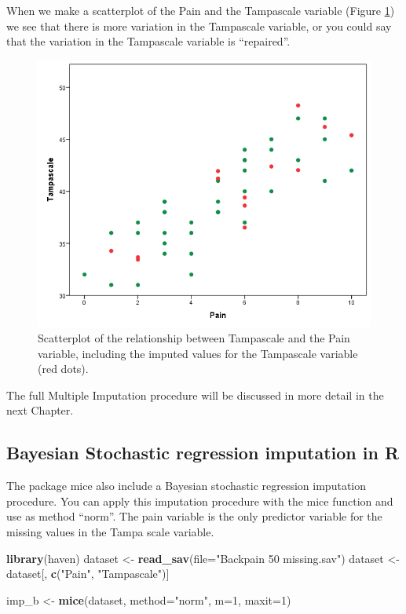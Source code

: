 \documentclass[
]{book}
\newenvironment{Shaded}{\begin{snugshade}}{\end{snugshade}}
\newcommand{\DataTypeTok}[1]{\textcolor[rgb]{0.13,0.29,0.53}{#1}}
\newcommand{\DecValTok}[1]{\textcolor[rgb]{0.00,0.00,0.81}{#1}}
\newcommand{\KeywordTok}[1]{\textcolor[rgb]{0.13,0.29,0.53}{\textbf{#1}}}
\newcommand{\NormalTok}[1]{#1}
\newcommand{\StringTok}[1]{\textcolor[rgb]{0.31,0.60,0.02}{#1}}
\begin{document}
When we make a scatterplot of the Pain and the Tampascale variable (Figure \ref{fig:fig3-24}) we see that there is more variation in the Tampascale variable, or you could say that the variation in the Tampascale variable is ``repaired''.

\begin{figure}

{\centering \includegraphics[width=0.7\linewidth]{images/Fig3.24} 

}

\caption{Scatterplot of the relationship between Tampascale and the Pain variable, including the imputed values for the Tampascale variable (red dots).}\label{fig:fig3-24}
\end{figure}

The full Multiple Imputation procedure will be discussed in more detail in the next Chapter.

\hypertarget{bayesian-stochastic-regression-imputation-in-r}{%
\subsection{Bayesian Stochastic regression imputation in R}\label{bayesian-stochastic-regression-imputation-in-r}}

The package mice also include a Bayesian stochastic regression imputation procedure. You can apply this imputation procedure with the mice function and use as method ``norm''. The pain variable is the only predictor variable for the missing values in the Tampa scale variable.

\begin{Shaded}
\begin{Highlighting}[]
\KeywordTok{library}\NormalTok{(haven)}
\NormalTok{dataset <-}\StringTok{ }\KeywordTok{read_sav}\NormalTok{(}\DataTypeTok{file=}\StringTok{"Backpain 50 missing.sav"}\NormalTok{)}
\NormalTok{dataset <-}\StringTok{ }\NormalTok{dataset[, }\KeywordTok{c}\NormalTok{(}\StringTok{"Pain"}\NormalTok{, }\StringTok{"Tampascale"}\NormalTok{)]}

\NormalTok{imp_b <-}\StringTok{ }\KeywordTok{mice}\NormalTok{(dataset, }\DataTypeTok{method=}\StringTok{"norm"}\NormalTok{, }\DataTypeTok{m=}\DecValTok{1}\NormalTok{, }\DataTypeTok{maxit=}\DecValTok{1}\NormalTok{)}
\end{Highlighting}
\end{Shaded}
\end{document}
